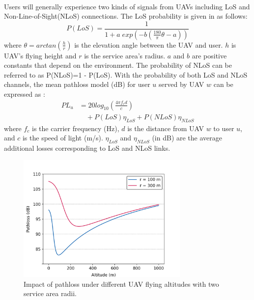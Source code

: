 \documentclass[a4paper,12pt]{report}
\begin{document}
\paragraph{}
Users will generally experience two kinds of signals from UAVs including LoS and Non-Line-of-Sight(NLoS) connections. The LoS probability is given in \cite{b8} as follows:
\begin{equation}
    P(LoS)=\frac{1}{1+a\;exp(-b(\frac{180}{\pi}\theta - a))}
\end{equation}
where $\theta=arctan(\frac{h}{r})$ is the elevation angle between the UAV and user. $h$ is UAV's flying height and $r$ is the service area's radius. $a$ and $b$ are positive constants that depend on the environment. The probability of NLoS can be referred to as P(NLoS)=1 - P(LoS). With the probability of both LoS and NLoS channels, the mean pathloss model (dB) for user $u$ served by UAV $w$ can be expressed as \cite{b7}:
\begin{equation}
    \begin{aligned}
    PL_{u} & = 20log_{10}(\frac{4\pi f_{c}d}{c})\\
    &\quad +P(LoS)\eta _{LoS}+P(NLoS)\eta _{NLoS}
    \end{aligned}
\end{equation}
where $f_{c}$ is the carrier frequency (Hz), $d$ is the distance from UAV $w$ to user $u$, and $c$ is the speed of light (m/s). $\eta _{LoS}$ and $\eta _{NLoS}$ (in dB) are the average additional losses corresponding to LoS and NLoS links.

\begin{figure} [t!]
    \centering
    \includegraphics[width=0.75\textwidth]{Figure 2.png}
    \caption{Impact of pathloss under different UAV flying altitudes with two service area radii.}
    \label{fig:Pathloss vs Altitude}
\end{figure}
\end{document}
